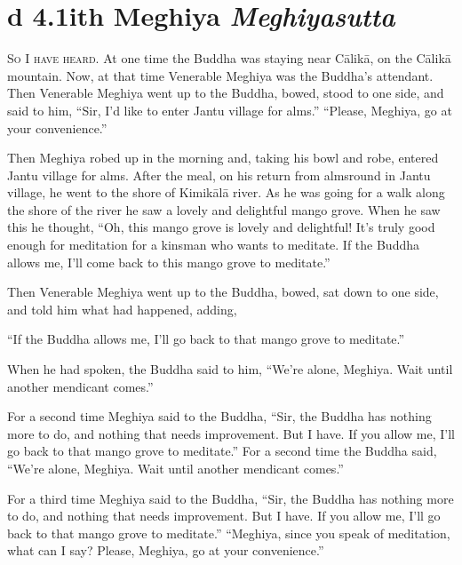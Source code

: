 \documentclass[12pt,openany]{book}%
\newcommand*{\suttatitleacronym}[1]{\smaller[2]{#1}\vspace*{.3em}}
\newcommand*{\suttatitletranslation}[1]{\linebreak{#1}}
\newcommand*{\suttatitleroot}[1]{\linebreak\smaller[2]\itshape{#1}}
\newcommand*{\tocacronym}[1]{\hspace*{-3.3em}{#1}\quad}
\newcommand*{\toctranslation}[1]{#1}
\newcommand*{\tocroot}[1]{(\textit{#1})}
\newcommand*{\scevam}[1]{\textsc{#1}}
\begin{document}
%
\section*{{\suttatitleacronym Ud 4.1}{\suttatitletranslation With Meghiya }{\suttatitleroot Meghiyasutta}}
\addcontentsline{toc}{section}{\tocacronym{Ud 4.1} \toctranslation{With Meghiya } \tocroot{Meghiyasutta}}

\scevam{So I have heard. }At one time the Buddha was staying near \textsanskrit{Cālikā}, on the \textsanskrit{Cālikā} mountain. Now, at that time Venerable Meghiya was the Buddha’s attendant. Then Venerable Meghiya went up to the Buddha, bowed, stood to one side, and said to him, “Sir, I’d like to enter Jantu village for alms.” “Please, Meghiya, go at your convenience.” 

Then Meghiya robed up in the morning and, taking his bowl and robe, entered Jantu village for alms. After the meal, on his return from almsround in Jantu village, he went to the shore of \textsanskrit{Kimikālā} river. As he was going for a walk along the shore of the river he saw a lovely and delightful mango grove. When he saw this he thought, “Oh, this mango grove is lovely and delightful! It’s truly good enough for meditation for a kinsman who wants to meditate. If the Buddha allows me, I’ll come back to this mango grove to meditate.” 

Then Venerable Meghiya went up to the Buddha, bowed, sat down to one side, and told him what had happened, adding, 

“If the Buddha allows me, I’ll go back to that mango grove to meditate.” 

When he had spoken, the Buddha said to him, “We’re alone, Meghiya. Wait until another mendicant comes.” 

For a second time Meghiya said to the Buddha, “Sir, the Buddha has nothing more to do, and nothing that needs improvement. But I have. If you allow me, I’ll go back to that mango grove to meditate.” For a second time the Buddha said, “We’re alone, Meghiya. Wait until another mendicant comes.” 

For a third time Meghiya said to the Buddha, “Sir, the Buddha has nothing more to do, and nothing that needs improvement. But I have. If you allow me, I’ll go back to that mango grove to meditate.” “Meghiya, since you speak of meditation, what can I say? Please, Meghiya, go at your convenience.” 
\end{document}
